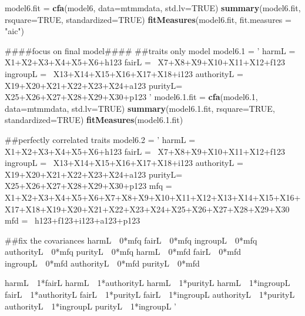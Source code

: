 \documentclass[english,man]{apa6}
\newenvironment{Shaded}{\begin{snugshade}}{\end{snugshade}}
\newcommand{\KeywordTok}[1]{\textcolor[rgb]{0.13,0.29,0.53}{\textbf{#1}}}
\newcommand{\DataTypeTok}[1]{\textcolor[rgb]{0.13,0.29,0.53}{#1}}
\newcommand{\DecValTok}[1]{\textcolor[rgb]{0.00,0.00,0.81}{#1}}
\newcommand{\FloatTok}[1]{\textcolor[rgb]{0.00,0.00,0.81}{#1}}
\newcommand{\StringTok}[1]{\textcolor[rgb]{0.31,0.60,0.02}{#1}}
\newcommand{\OtherTok}[1]{\textcolor[rgb]{0.56,0.35,0.01}{#1}}
\newcommand{\NormalTok}[1]{#1}
\theoremstyle{definition}
\theoremstyle{definition}
\theoremstyle{definition}
\theoremstyle{remark}
\begin{document}
\begin{Shaded}
\begin{Highlighting}[]
\NormalTok{model6.fit =}\StringTok{ }\KeywordTok{cfa}\NormalTok{(model6, }\DataTypeTok{data=}\NormalTok{mtmmdata, }\DataTypeTok{std.lv=}\OtherTok{TRUE}\NormalTok{)}
\KeywordTok{summary}\NormalTok{(model6.fit, }\DataTypeTok{rsquare=}\OtherTok{TRUE}\NormalTok{, }\DataTypeTok{standardized=}\OtherTok{TRUE}\NormalTok{)}
\KeywordTok{fitMeasures}\NormalTok{(model6.fit, }\DataTypeTok{fit.measures =} \StringTok{"aic"}\NormalTok{)}


\NormalTok{####focus on final model####}
\NormalTok{##traits only model}
\NormalTok{model6.}\DecValTok{1}\NormalTok{ =}\StringTok{ '}
\StringTok{harmL =~ X1+X2+X3+X4+X5+X6+h123}
\StringTok{fairL =~ X7+X8+X9+X10+X11+X12+f123}
\StringTok{ingroupL =~ X13+X14+X15+X16+X17+X18+i123}
\StringTok{authorityL =~ X19+X20+X21+X22+X23+X24+a123}
\StringTok{purityL=~ X25+X26+X27+X28+X29+X30+p123}
\StringTok{'}
\NormalTok{model6.}\FloatTok{1.}\NormalTok{fit =}\StringTok{ }\KeywordTok{cfa}\NormalTok{(model6.}\DecValTok{1}\NormalTok{, }\DataTypeTok{data=}\NormalTok{mtmmdata, }\DataTypeTok{std.lv=}\OtherTok{TRUE}\NormalTok{)}
\KeywordTok{summary}\NormalTok{(model6.}\FloatTok{1.}\NormalTok{fit, }\DataTypeTok{rsquare=}\OtherTok{TRUE}\NormalTok{, }\DataTypeTok{standardized=}\OtherTok{TRUE}\NormalTok{)}
\KeywordTok{fitMeasures}\NormalTok{(model6.}\FloatTok{1.}\NormalTok{fit)}

\NormalTok{##perfectly correlated traits}
\NormalTok{model6.}\DecValTok{2}\NormalTok{ =}\StringTok{ '}
\StringTok{harmL =~ X1+X2+X3+X4+X5+X6+h123}
\StringTok{fairL =~ X7+X8+X9+X10+X11+X12+f123}
\StringTok{ingroupL =~ X13+X14+X15+X16+X17+X18+i123}
\StringTok{authorityL =~ X19+X20+X21+X22+X23+X24+a123}
\StringTok{purityL=~ X25+X26+X27+X28+X29+X30+p123}
\StringTok{mfq =~ X1+X2+X3+X4+X5+X6+X7+X8+X9+X10+X11+X12+X13+X14+X15+X16+X17+X18+X19+X20+X21+X22+X23+X24+X25+X26+X27+X28+X29+X30}
\StringTok{mfd =~ h123+f123+i123+a123+p123}

\StringTok{##fix the covariances}
\StringTok{harmL~~0*mfq}
\StringTok{fairL~~0*mfq}
\StringTok{ingroupL~~0*mfq}
\StringTok{authorityL~~0*mfq}
\StringTok{purityL~~0*mfq}
\StringTok{harmL~~0*mfd}
\StringTok{fairL~~0*mfd}
\StringTok{ingroupL~~0*mfd}
\StringTok{authorityL~~0*mfd}
\StringTok{purityL~~0*mfd}

\StringTok{harmL~~1*fairL}
\StringTok{harmL~~1*authorityL}
\StringTok{harmL~~1*purityL}
\StringTok{harmL~~1*ingroupL}
\StringTok{fairL~~1*authorityL}
\StringTok{fairL~~1*purityL}
\StringTok{fairL~~1*ingroupL}
\StringTok{authorityL~~1*purityL}
\StringTok{authorityL~~1*ingroupL}
\StringTok{purityL~~1*ingroupL}
\StringTok{'}


\end{Highlighting}
\end{Shaded}
\end{document}
